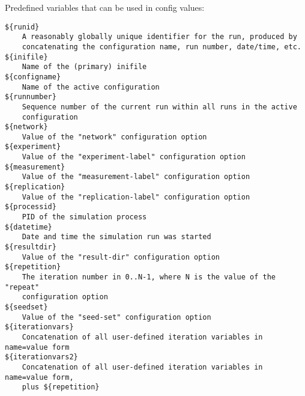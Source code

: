 Predefined variables that can be used in config values:

\begin{verbatim}
${runid}
    A reasonably globally unique identifier for the run, produced by
    concatenating the configuration name, run number, date/time, etc.
${inifile}
    Name of the (primary) inifile
${configname}
    Name of the active configuration
${runnumber}
    Sequence number of the current run within all runs in the active
    configuration
${network}
    Value of the "network" configuration option
${experiment}
    Value of the "experiment-label" configuration option
${measurement}
    Value of the "measurement-label" configuration option
${replication}
    Value of the "replication-label" configuration option
${processid}
    PID of the simulation process
${datetime}
    Date and time the simulation run was started
${resultdir}
    Value of the "result-dir" configuration option
${repetition}
    The iteration number in 0..N-1, where N is the value of the "repeat"
    configuration option
${seedset}
    Value of the "seed-set" configuration option
${iterationvars}
    Concatenation of all user-defined iteration variables in name=value form
${iterationvars2}
    Concatenation of all user-defined iteration variables in name=value form,
    plus ${repetition}
\end{verbatim}


